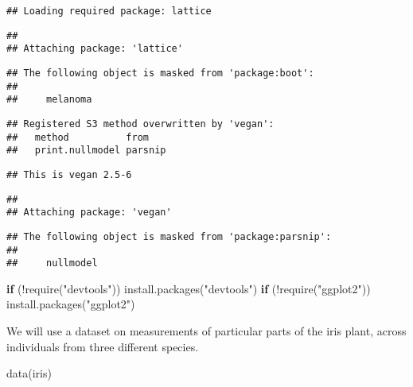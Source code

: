 \documentclass[
]{book}
\newenvironment{Shaded}{\begin{snugshade}}{\end{snugshade}}
\newcommand{\ControlFlowTok}[1]{\textcolor[rgb]{0.13,0.29,0.53}{\textbf{#1}}}
\newcommand{\FunctionTok}[1]{\textcolor[rgb]{0.00,0.00,0.00}{#1}}
\newcommand{\NormalTok}[1]{#1}
\newcommand{\SpecialCharTok}[1]{\textcolor[rgb]{0.00,0.00,0.00}{#1}}
\newcommand{\StringTok}[1]{\textcolor[rgb]{0.31,0.60,0.02}{#1}}
\begin{document}
\begin{verbatim}
## Loading required package: lattice
\end{verbatim}

\begin{verbatim}
## 
## Attaching package: 'lattice'
\end{verbatim}

\begin{verbatim}
## The following object is masked from 'package:boot':
## 
##     melanoma
\end{verbatim}

\begin{verbatim}
## Registered S3 method overwritten by 'vegan':
##   method          from   
##   print.nullmodel parsnip
\end{verbatim}

\begin{verbatim}
## This is vegan 2.5-6
\end{verbatim}

\begin{verbatim}
## 
## Attaching package: 'vegan'
\end{verbatim}

\begin{verbatim}
## The following object is masked from 'package:parsnip':
## 
##     nullmodel
\end{verbatim}

\begin{Shaded}
\begin{Highlighting}[]
\ControlFlowTok{if}\NormalTok{ (}\SpecialCharTok{!}\FunctionTok{require}\NormalTok{(}\StringTok{"devtools"}\NormalTok{)) }\FunctionTok{install.packages}\NormalTok{(}\StringTok{"devtools"}\NormalTok{)}
\ControlFlowTok{if}\NormalTok{ (}\SpecialCharTok{!}\FunctionTok{require}\NormalTok{(}\StringTok{"ggplot2"}\NormalTok{)) }\FunctionTok{install.packages}\NormalTok{(}\StringTok{"ggplot2"}\NormalTok{)}
\end{Highlighting}
\end{Shaded}

We will use a dataset on measurements of particular parts of the iris plant, across individuals from three different species.

\begin{Shaded}
\begin{Highlighting}[]
\FunctionTok{data}\NormalTok{(iris)}
\end{Highlighting}
\end{Shaded}
\end{document}
